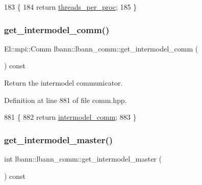 \begin{DoxyCode}
183                                                   \{
184     \textcolor{keywordflow}{return} \hyperlink{classlbann_1_1lbann__comm_a23ff8e3563e4472af29d15f6cb823bc1}{threads\_per\_proc};
185   \}
\end{DoxyCode}
\mbox{\label{classlbann_1_1lbann__comm_a61d59b7dff63ece4c10cd3946b41cb39}} 
\subsubsection{\texorpdfstring{get\+\_\+intermodel\+\_\+comm()}{get\_intermodel\_comm()}}
{\footnotesize\ttfamily El\+::mpi\+::\+Comm lbann\+::lbann\+\_\+comm\+::get\+\_\+intermodel\+\_\+comm (\begin{DoxyParamCaption}{ }\end{DoxyParamCaption}) const\hspace{0.3cm}{\ttfamily [inline]}}

Return the intermodel communicator. 

Definition at line 881 of file comm.\+hpp.


\begin{DoxyCode}
881                                         \{
882     \textcolor{keywordflow}{return} \hyperlink{classlbann_1_1lbann__comm_a2c51c5d8faf4f0ab4f43b892c55e597b}{intermodel\_comm};
883   \}
\end{DoxyCode}
\mbox{\label{classlbann_1_1lbann__comm_adbd99fe6c8df2689217c9ee16d6234d7}} 
\subsubsection{\texorpdfstring{get\+\_\+intermodel\+\_\+master()}{get\_intermodel\_master()}}
{\footnotesize\ttfamily int lbann\+::lbann\+\_\+comm\+::get\+\_\+intermodel\+\_\+master (\begin{DoxyParamCaption}{ }\end{DoxyParamCaption}) const\hspace{0.3cm}{\ttfamily [inline]}}

